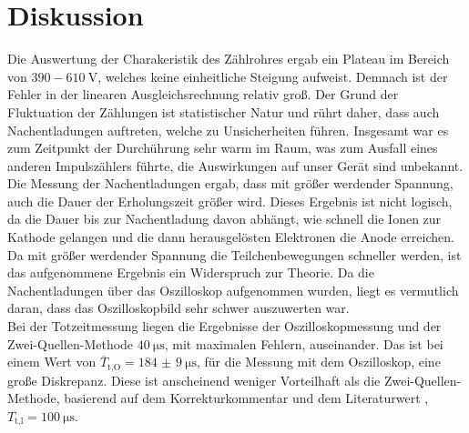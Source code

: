 \section{Diskussion}
\label{sec:Diskussion}
Die Auswertung der Charakeristik des Zählrohres ergab ein Plateau
im Bereich von $390-\SI{610}{\volt}$, welches keine
einheitliche Steigung aufweist. Demnach ist der Fehler in der linearen
Ausgleichsrechnung relativ groß. Der Grund der Fluktuation der Zählungen ist
statistischer Natur und rührt daher, dass auch Nachentladungen auftreten, welche
zu Unsicherheiten führen. Insgesamt war es zum Zeitpunkt der Durchührung sehr warm
im Raum, was zum Ausfall eines anderen Impulszählers führte, die Auswirkungen auf
unser Gerät sind unbekannt.
\\
Die Messung der Nachentladungen ergab, dass mit größer werdender Spannung, auch
die Dauer der Erholungszeit größer wird. Dieses Ergebnis ist nicht logisch,
da die Dauer bis zur Nachentladung davon abhängt, wie schnell die
Ionen zur Kathode gelangen und die dann herausgelösten Elektronen die Anode
erreichen. Da  mit größer werdender Spannung die Teilchenbewegungen
schneller werden, ist das aufgenommene Ergebnis ein Widerspruch zur Theorie.
Da die Nachentladungen über das Oszilloskop aufgenommen wurden, liegt es
vermutlich daran, dass das Oszilloskopbild sehr schwer auszuwerten war.
\\
Bei der Totzeitmessung liegen die Ergebnisse der Oszilloskopmessung und der
Zwei-Quellen-Methode $\SI{40}{\micro\second}$, mit maximalen Fehlern, auseinander.
Das ist bei einem Wert von
$\overline{T}_\text{t,O} = \SI{184(9)}{\micro\second}$,
für die Messung mit dem Oszilloskop,
eine große Diskrepanz.
Diese ist anscheinend weniger Vorteilhaft als die Zwei-Quellen-Methode,
basierend auf dem Korrekturkommentar und dem Literaturwert \cite{totzeit},
$T_\text{t,l}=\SI{100}{\micro\second}$.
